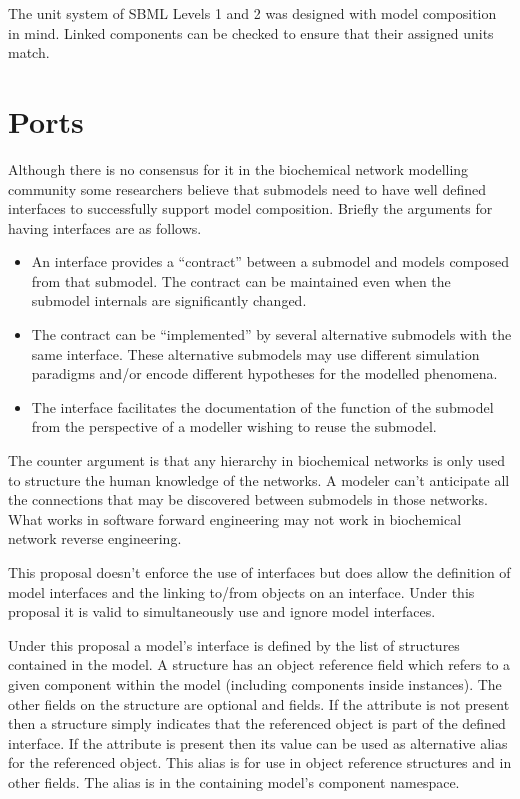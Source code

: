 \documentclass{cekarticle}
\begin{document}
The unit system of SBML Levels 1 and 2 was designed with model composition in mind.
Linked components can be checked to ensure that their assigned units match. 

\section{Ports}
\label{sec:ports}

Although there is no consensus for it in the biochemical network modelling community some researchers
believe that submodels need to have well defined interfaces to successfully support model composition.
Briefly the arguments for having interfaces are as follows.
\begin{itemize}
\item An interface provides a ``contract'' between a submodel and models composed
from that submodel.  The contract can be 
maintained even when the submodel internals are significantly changed.
\item The contract can be ``implemented'' by several alternative submodels with the same interface.  These
alternative submodels may use different simulation paradigms and/or encode different hypotheses for the modelled
phenomena. 
\item The interface facilitates the documentation of the function of the submodel from the perspective of a modeller
wishing to reuse the submodel.
\end{itemize}

The counter argument is that any hierarchy in biochemical networks is only used to structure the human knowledge
of the networks.  A modeler can't anticipate all the connections that may be discovered between submodels in those
networks.  What works in software forward engineering may not work in biochemical network reverse engineering.

This proposal doesn't enforce the use of interfaces but does allow the definition of model interfaces and
the linking to/from objects on an interface.  Under this proposal it is valid to simultaneously use and ignore model interfaces.

Under this proposal a model's interface is defined by the list of  structures contained in the model.
A  structure has an object reference field which refers to a given component within the model (including
components inside instances).  The other fields on the  structure are optional  and
 fields.  If the  attribute is not present then a  structure simply indicates
that the referenced object is part of the defined interface.  If the  attribute is present then its value
can be used as alternative alias for the referenced object.  This alias is for use in object reference structures and
in other  fields.  The alias is in the containing model's component namespace.
\end{document}
